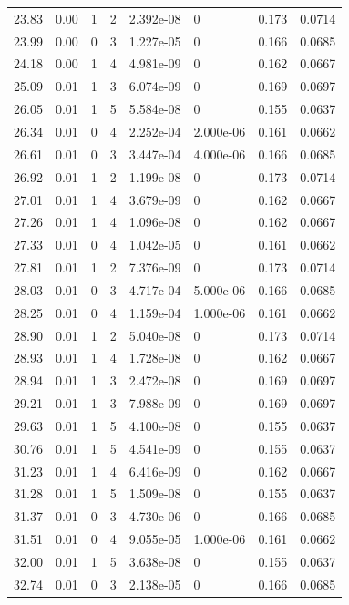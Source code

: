 \documentclass[preview]{standalone}
\begin{document}
{{{\begin{tabular}{L{1.2cm}C{1.2cm} C{0.3cm}C{0.5cm} C{1.4cm}C{1.4cm} C{1.4cm}C{1.4cm}}
  23.83  &  0.00  & 1     &  2 &  2.392e-08  & 0  & 0.173 &  0.0714   \\ 
  23.99  &  0.00  & 0     &  3 &  1.227e-05  & 0  & 0.166 &  0.0685   \\ 
  24.18  &  0.00  & 1     &  4 &  4.981e-09  & 0  & 0.162 &  0.0667   \\ 
  25.09  &  0.01  & 1     &  3 &  6.074e-09  & 0  & 0.169 &  0.0697   \\ 
  26.05  &  0.01  & 1     &  5 &  5.584e-08  & 0  & 0.155 &  0.0637   \\ 
  26.34  &  0.01  & 0     &  4 &  2.252e-04  & 2.000e-06  & 0.161 &  0.0662   \\ 
  26.61  &  0.01  & 0     &  3 &  3.447e-04  & 4.000e-06  & 0.166 &  0.0685   \\ 
  26.92  &  0.01  & 1     &  2 &  1.199e-08  & 0  & 0.173 &  0.0714   \\ 
  27.01  &  0.01  & 1     &  4 &  3.679e-09  & 0  & 0.162 &  0.0667   \\ 
  27.26  &  0.01  & 1     &  4 &  1.096e-08  & 0  & 0.162 &  0.0667   \\ 
  27.33  &  0.01  & 0     &  4 &  1.042e-05  & 0  & 0.161 &  0.0662   \\ 
  27.81  &  0.01  & 1     &  2 &  7.376e-09  & 0  & 0.173 &  0.0714   \\ 
  28.03  &  0.01  & 0     &  3 &  4.717e-04  & 5.000e-06  & 0.166 &  0.0685   \\ 
  28.25  &  0.01  & 0     &  4 &  1.159e-04  & 1.000e-06  & 0.161 &  0.0662   \\ 
  28.90  &  0.01  & 1     &  2 &  5.040e-08  & 0  & 0.173 &  0.0714   \\ 
  28.93  &  0.01  & 1     &  4 &  1.728e-08  & 0  & 0.162 &  0.0667   \\ 
  28.94  &  0.01  & 1     &  3 &  2.472e-08  & 0  & 0.169 &  0.0697   \\ 
  29.21  &  0.01  & 1     &  3 &  7.988e-09  & 0  & 0.169 &  0.0697   \\ 
  29.63  &  0.01  & 1     &  5 &  4.100e-08  & 0  & 0.155 &  0.0637   \\ 
  30.76  &  0.01  & 1     &  5 &  4.541e-09  & 0  & 0.155 &  0.0637   \\ 
  31.23  &  0.01  & 1     &  4 &  6.416e-09  & 0  & 0.162 &  0.0667   \\ 
  31.28  &  0.01  & 1     &  5 &  1.509e-08  & 0  & 0.155 &  0.0637   \\ 
  31.37  &  0.01  & 0     &  3 &  4.730e-06  & 0  & 0.166 &  0.0685   \\ 
  31.51  &  0.01  & 0     &  4 &  9.055e-05  & 1.000e-06  & 0.161 &  0.0662   \\ 
  32.00  &  0.01  & 1     &  5 &  3.638e-08  & 0  & 0.155 &  0.0637   \\ 
  32.74  &  0.01  & 0     &  3 &  2.138e-05  & 0  & 0.166 &  0.0685   \\ 
\hline 
\end{tabular} 

}}}
\end{document}
